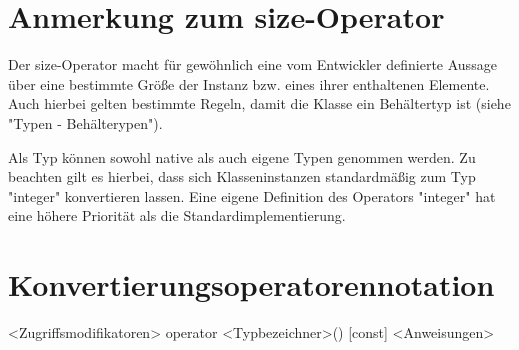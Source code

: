 \section{Anmerkung zum size-Operator}
Der size-Operator macht für gewöhnlich eine vom Entwickler definierte Aussage über eine bestimmte Größe der Instanz bzw. eines ihrer enthaltenen
Elemente.
Auch hierbei gelten bestimmte Regeln, damit die Klasse ein Behältertyp ist (siehe "Typen - Behälterypen").

Als Typ können sowohl native als auch eigene Typen genommen werden. Zu beachten gilt es hierbei, dass sich Klasseninstanzen standardmäßig
zum Typ "integer" konvertieren lassen.
Eine eigene Definition des Operators "integer" hat eine höhere Priorität als die Standardimplementierung.

\section{Konvertierungsoperatorennotation} 
<Zugriffsmodifikatoren> operator <Typbezeichner>() [const]
{
	<Anweisungen>
}

